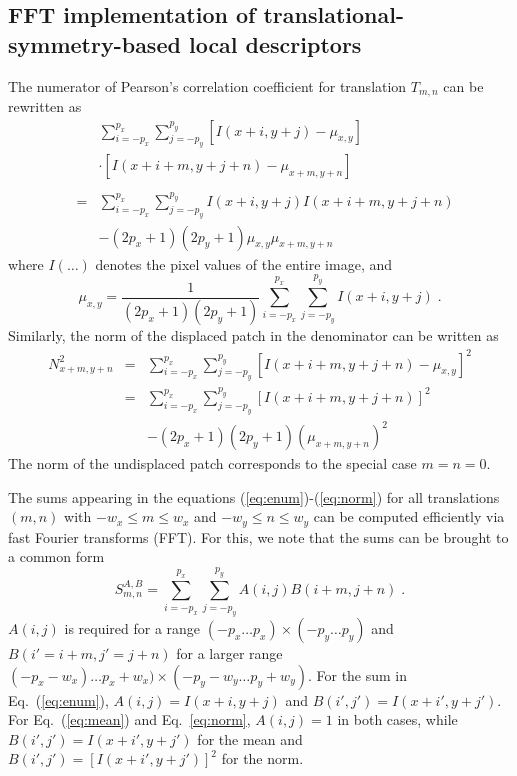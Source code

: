 \documentclass[twocolumn,amsmath, floatfix]{revtex4}
\begin{document}
\subsection{FFT implementation of translational-symmetry-based local descriptors}\label{FFT_implementation}
The numerator of Pearson's correlation coefficient for translation $T_{m,n}$
can be rewritten as
\begin{eqnarray}
&&\sum_{i=-p_x}^{p_x}\sum_{j=-p_y}^{p_y} \left[I(x+i,y+j) - \mu_{x,y}\right] \\
&&\cdot \left[I(x+i+m,y+j+n) - \mu_{x+m,y+n}\right]\\
\nonumber\\
&=& \sum_{i=-p_x}^{p_x}\sum_{j=-p_y}^{p_y} I(x+i,y+j) I(x+i+m,y+j+n)
\nonumber\\
&& - (2p_x+1)(2p_y+1)\mu_{x,y}\mu_{x+m,y+n}
\label{eq:enum}
\end{eqnarray}
where $I(\dots)$ denotes the pixel values of the entire image, and
\begin{equation}
\mu_{x,y} = \frac{1}{(2p_x + 1)(2p_y+1)} \sum_{i=-p_x}^{p_x}\sum_{j=-p_y}^{p_y} I(x+i,y+j)
   \;.
\label{eq:mean}
\end{equation}
Similarly, the norm of the displaced patch in the denominator can be written as
\begin{eqnarray}
N_{x+m,y+n}^2 &=& \sum_{i=-p_x}^{p_x}\sum_{j=-p_y}^{p_y} \left[I(x+i+m,y+j+n) - \mu_{x,y}\right]^2
\nonumber\\
&=&
\sum_{i=-p_x}^{p_x}\sum_{j=-p_y}^{p_y} [I(x+i+m,y+j+n)]^2
\nonumber\\ &&
   - (2p_x+1)(2p_y+1)(\mu_{x+m,y+n})^2
\label{eq:norm}
\end{eqnarray}
The norm of the undisplaced patch corresponds to the special case $m=n=0$.

The sums appearing in the equations (\ref{eq:enum})-(\ref{eq:norm})
for all translations $(m,n)$ with $-w_x \le m \le w_x$ and $-w_y \le n \le w_y$ can be computed
efficiently via fast Fourier transforms (FFT).
For this, we note that the sums can be brought to a common form
\begin{equation}
S^{A,B}_{m,n} = \sum_{i=-p_x}^{p_x}\sum_{j=-p_y}^{p_y} A(i,j) B(i+m,j+n)
   \;.
\label{eq:sumAB}
\end{equation}
$A(i,j)$ is required for a range $(-p_x\dots p_x)\times(-p_y \dots p_y)$ and $B(i'=i+m,j'=j+n)$ for
a larger range $(-p_x-w_x)\dots p_x+w_x)\times(-p_y-w_y \dots p_y+w_y)$.
For the sum in Eq.~(\ref{eq:enum}), $A(i,j)=I(x+i,y+j)$ and $B(i',j')=I(x+i',y+j')$.
For Eq.~(\ref{eq:mean}) and Eq.~\ref{eq:norm}, $A(i,j) = 1$ in both cases, while $B(i',j') = I(x+i',y+j')$
for the mean and $B(i',j') = [I(x+i',y+j')]^2$ for the norm.
\end{document}
